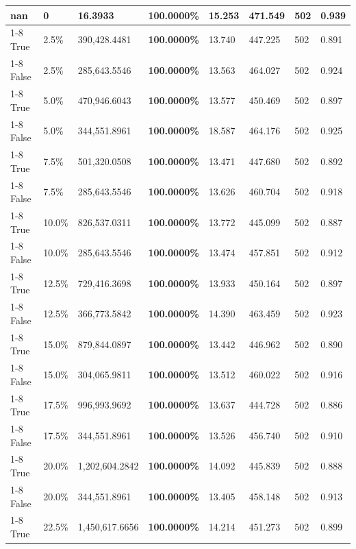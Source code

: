 \begin{table}[H]
{\begin{tabular}{lllrllll}
\midrule
nan & 0 & \bfseries 16.3933 & \bfseries 100.0000\% & 15.253 & 471.549 & 502 & 0.939 \\
\cline{1-8}
True & 2.5\% & 390,428.4481 & \bfseries \color{red} 100.0000\% & 13.740 & 447.225 & 502 & 0.891 \\
\cline{1-8}
False & 2.5\% & 285,643.5546 & \bfseries \color{red} 100.0000\% & 13.563 & 464.027 & 502 & 0.924 \\
\cline{1-8}
True & 5.0\% & 470,946.6043 & \bfseries \color{red} 100.0000\% & 13.577 & 450.469 & 502 & 0.897 \\
\cline{1-8}
False & 5.0\% & 344,551.8961 & \bfseries \color{red} 100.0000\% & 18.587 & 464.176 & 502 & 0.925 \\
\cline{1-8}
True & 7.5\% & 501,320.0508 & \bfseries \color{red} 100.0000\% & 13.471 & 447.680 & 502 & 0.892 \\
\cline{1-8}
False & 7.5\% & 285,643.5546 & \bfseries \color{red} 100.0000\% & 13.626 & 460.704 & 502 & 0.918 \\
\cline{1-8}
True & 10.0\% & 826,537.0311 & \bfseries \color{red} 100.0000\% & 13.772 & 445.099 & 502 & 0.887 \\
\cline{1-8}
False & 10.0\% & 285,643.5546 & \bfseries \color{red} 100.0000\% & 13.474 & 457.851 & 502 & 0.912 \\
\cline{1-8}
True & 12.5\% & 729,416.3698 & \bfseries \color{red} 100.0000\% & 13.933 & 450.164 & 502 & 0.897 \\
\cline{1-8}
False & 12.5\% & 366,773.5842 & \bfseries \color{red} 100.0000\% & 14.390 & 463.459 & 502 & 0.923 \\
\cline{1-8}
True & 15.0\% & 879,844.0897 & \bfseries \color{red} 100.0000\% & 13.442 & 446.962 & 502 & 0.890 \\
\cline{1-8}
False & 15.0\% & 304,065.9811 & \bfseries \color{red} 100.0000\% & 13.512 & 460.022 & 502 & 0.916 \\
\cline{1-8}
True & 17.5\% & 996,993.9692 & \bfseries \color{red} 100.0000\% & 13.637 & 444.728 & 502 & 0.886 \\
\cline{1-8}
False & 17.5\% & 344,551.8961 & \bfseries \color{red} 100.0000\% & 13.526 & 456.740 & 502 & 0.910 \\
\cline{1-8}
True & 20.0\% & 1,202,604.2842 & \bfseries \color{red} 100.0000\% & 14.092 & 445.839 & 502 & 0.888 \\
\cline{1-8}
False & 20.0\% & 344,551.8961 & \bfseries \color{red} 100.0000\% & 13.405 & 458.148 & 502 & 0.913 \\
\cline{1-8}
True & 22.5\% & 1,450,617.6656 & \bfseries \color{red} 100.0000\% & 14.214 & 451.273 & 502 & 0.899 \\

\end{tabular}}
\end{table}
